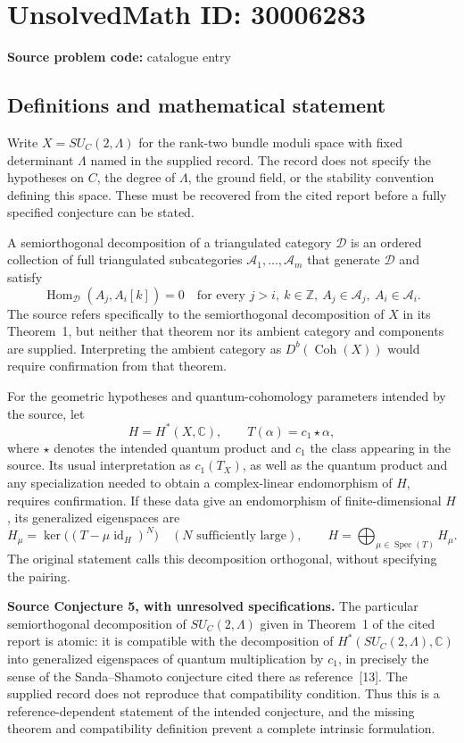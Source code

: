 \documentclass[11pt]{article}
\newcommand{\Z}{\mathbb{Z}}
\newcommand{\C}{\mathbb{C}}
\begin{document}
\section*{UnsolvedMath ID: 30006283}
\textbf{Source problem code:} catalogue entry
\subsection{Definitions and mathematical statement}
Write \(X=SU_C(2,\Lambda)\) for the rank-two bundle moduli space with fixed determinant \(\Lambda\) named in the supplied record. The record does not specify the hypotheses on \(C\), the degree of \(\Lambda\), the ground field, or the stability convention defining this space. These must be recovered from the cited report before a fully specified conjecture can be stated.

A semiorthogonal decomposition of a triangulated category \(\mathcal D\) is an ordered collection of full triangulated subcategories \(\mathcal A_1,\ldots,\mathcal A_m\) that generate \(\mathcal D\) and satisfy
\[
\operatorname{Hom}_{\mathcal D}(A_j,A_i[k])=0
\quad\text{for every }j>i,\ k\in\Z,
\ A_j\in\mathcal A_j,\ A_i\in\mathcal A_i.
\]
The source refers specifically to the semiorthogonal decomposition of \(X\) in its Theorem~1, but neither that theorem nor its ambient category and components are supplied. Interpreting the ambient category as \(D^b(\operatorname{Coh}(X))\) would require confirmation from that theorem.

For the geometric hypotheses and quantum-cohomology parameters intended by the source, let
\[
H=H^*(X,\C),\qquad T(\alpha)=c_1\star\alpha,
\]
where \(\star\) denotes the intended quantum product and \(c_1\) the class appearing in the source. Its usual interpretation as \(c_1(T_X)\), as well as the quantum product and any specialization needed to obtain a complex-linear endomorphism of \(H\), requires confirmation. If these data give an endomorphism of finite-dimensional \(H\), its generalized eigenspaces are
\[
H_\mu=\ker\bigl((T-\mu\operatorname{id}_H)^N\bigr)
\quad(N\text{ sufficiently large}),\qquad
H=\bigoplus_{\mu\in\operatorname{Spec}(T)}H_\mu.
\]
The original statement calls this decomposition orthogonal, without specifying the pairing.

\textbf{Source Conjecture 5, with unresolved specifications.} The particular semiorthogonal decomposition of \(SU_C(2,\Lambda)\) given in Theorem~1 of the cited report is atomic: it is compatible with the decomposition of \(H^*(SU_C(2,\Lambda),\C)\) into generalized eigenspaces of quantum multiplication by \(c_1\), in precisely the sense of the Sanda--Shamoto conjecture cited there as reference~[13]. The supplied record does not reproduce that compatibility condition. Thus this is a reference-dependent statement of the intended conjecture, and the missing theorem and compatibility definition prevent a complete intrinsic formulation.
\end{document}
